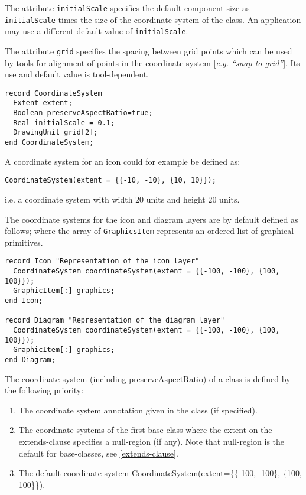 The attribute \lstinline!initialScale! specifies the default component size as
\lstinline!initialScale! times the size of the coordinate system of the class. An
application may use a different default value of \lstinline!initialScale!.

The attribute \lstinline!grid! specifies the spacing between grid points which can
be used by tools for alignment of points in the coordinate system
{[}\emph{e.g. ``snap-to-grid''}{]}. Its use and default value is
tool-dependent.

\begin{lstlisting}[language=modelica]
record CoordinateSystem
  Extent extent;
  Boolean preserveAspectRatio=true;
  Real initialScale = 0.1;
  DrawingUnit grid[2];
end CoordinateSystem;
\end{lstlisting}

\begin{example}
A coordinate system for an icon could for example be defined as:
\begin{lstlisting}[language=modelica]
CoordinateSystem(extent = {{-10, -10}, {10, 10}});
\end{lstlisting}
i.e. a coordinate system with width 20 units and height 20 units.
\end{example}

The coordinate systems for the icon and diagram layers are by default
defined as follows; where the array of \lstinline!GraphicsItem! represents an
ordered list of graphical primitives.

\begin{lstlisting}[language=modelica]
record Icon "Representation of the icon layer"
  CoordinateSystem coordinateSystem(extent = {{-100, -100}, {100, 100}});
  GraphicItem[:] graphics;
end Icon;

record Diagram "Representation of the diagram layer"
  CoordinateSystem coordinateSystem(extent = {{-100, -100}, {100, 100}});
  GraphicItem[:] graphics;
end Diagram;
\end{lstlisting}
The coordinate system (including preserveAspectRatio) of a class is
defined by the following priority:

\begin{enumerate}
\item
  The coordinate system annotation given in the class (if specified).
\item
  The coordinate systems of the first base-class where the extent on the
  extends-clause specifies a null-region (if any). Note that null-region
  is the default for base-classes, see \autoref{extends-clause}.
\item
  The default coordinate system CoordinateSystem(extent=\{\{-100,
  -100\}, \{100, 100\}\}).
\end{enumerate}

